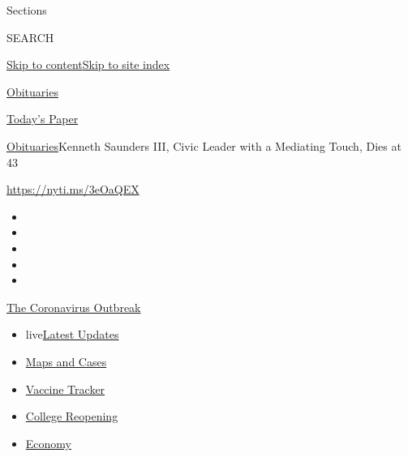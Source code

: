 Sections

SEARCH

\protect\hyperlink{site-content}{Skip to
content}\protect\hyperlink{site-index}{Skip to site index}

\href{https://www.nytimes.com/section/obituaries}{Obituaries}

\href{https://myaccount.nytimes.com/auth/login?response_type=cookie\&client_id=vi}{}

\href{https://www.nytimes.com/section/todayspaper}{Today's Paper}

\href{/section/obituaries}{Obituaries}\textbar{}Kenneth Saunders III,
Civic Leader with a Mediating Touch, Dies at 43

\url{https://nyti.ms/3eOaQEX}

\begin{itemize}
\item
\item
\item
\item
\item
\end{itemize}

\href{https://www.nytimes.com/news-event/coronavirus?action=click\&pgtype=Article\&state=default\&region=TOP_BANNER\&context=storylines_menu}{The
Coronavirus Outbreak}

\begin{itemize}
\tightlist
\item
  live\href{https://www.nytimes.com/2020/08/03/world/coronavirus-covid-19.html?action=click\&pgtype=Article\&state=default\&region=TOP_BANNER\&context=storylines_menu}{Latest
  Updates}
\item
  \href{https://www.nytimes.com/interactive/2020/us/coronavirus-us-cases.html?action=click\&pgtype=Article\&state=default\&region=TOP_BANNER\&context=storylines_menu}{Maps
  and Cases}
\item
  \href{https://www.nytimes.com/interactive/2020/science/coronavirus-vaccine-tracker.html?action=click\&pgtype=Article\&state=default\&region=TOP_BANNER\&context=storylines_menu}{Vaccine
  Tracker}
\item
  \href{https://www.nytimes.com/2020/08/02/us/covid-college-reopening.html?action=click\&pgtype=Article\&state=default\&region=TOP_BANNER\&context=storylines_menu}{College
  Reopening}
\item
  \href{https://www.nytimes.com/live/2020/08/03/business/stock-market-today-coronavirus?action=click\&pgtype=Article\&state=default\&region=TOP_BANNER\&context=storylines_menu}{Economy}
\end{itemize}

